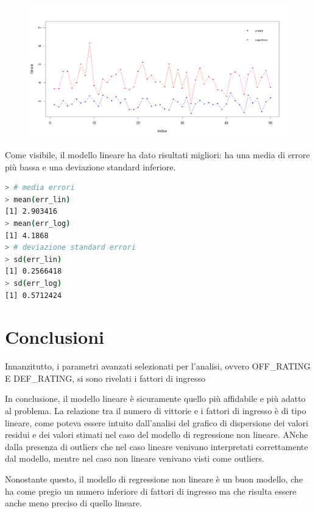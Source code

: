 \documentclass[11pt,a4paper]{article}
\begin{document}
\begin{figure}[H]
	\begin{center}
		\vspace{-0.4cm}
		\hspace*{-2.7cm}
		\includegraphics[scale=0.65]{imgs/results.png}
		\vspace{-1.5cm}
	\end{center}
\end{figure}

Come visibile, il modello lineare ha dato risultati migliori: 
ha una media di errore più bassa e una deviazione standard inferiore.

\begin{lstlisting}[language=bash,basicstyle=\tiny,tabsize=2,frame = single]
> # media errori
> mean(err_lin)
[1] 2.903416
> mean(err_log)
[1] 4.1868
> # deviazione standard errori
> sd(err_lin)
[1] 0.2566418
> sd(err_log)
[1] 0.5712424
\end{lstlisting}

\section{Conclusioni}
Innanzitutto, i parametri avanzati selezionati per l'analisi, ovvero OFF\_RATING E DEF\_RATING, si sono rivelati i fattori di ingresso 

In conclusione, il modello lineare è sicuramente quello più affidabile e più adatto al problema. La relazione tra il numero di vittorie e i fattori di ingresso è di tipo lineare, come poteva essere intuito dall'analisi del grafico di dispersione dei valori residui e dei valori stimati nel caso del modello di regressione non lineare.
ANche dalla presenza di outliers che nel caso lineare venivano interpretati correttamente dal modello, mentre nel caso non lineare venivano visti come outliers.

Nonostante questo, il modello di regressione non lineare è un buon modello, che ha come pregio un numero inferiore di fattori di ingresso ma che risulta essere anche meno preciso di quello lineare.
\end{document}
